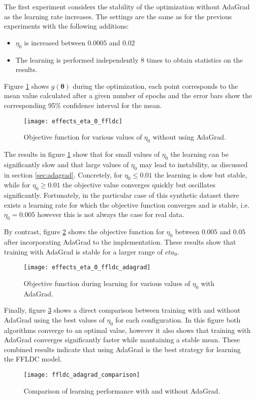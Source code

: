 The first experiment considers the stability of the optimization without AdaGrad as the learning rate increases. The settings are the same as for the previous experiments with the following additions:

\begin{itemize}
  \item $\eta_{0}$ is increased between $0.0005$ and $0.02$
  \item The learning is performed independently 8 times to obtain statistics on the results.
\end{itemize}

Figure \ref{fig:effects_eta_0} shows $g(\boldsymbol{\theta})$ during the optimization, each point corresponds to the mean value calculated after a given number of epochs and the error bars show the corresponding 95\% confidence interval for the mean.

\begin{figure}
  \centering
  \texttt{[image: effects\_eta\_0\_ffldc]}
  \caption{Objective function for various values of $\eta_0$ without using AdaGrad.}
  \label{fig:effects_eta_0}
\end{figure}

The results in figure \ref{fig:effects_eta_0} show that for small values of $\eta_0$ the learning can be significantly slow and that large values of $\eta_0$ may lead to instability, as discussed in section \ref{sec:adagrad}. Concretely, for $\eta_{0} \leq 0.01$ the learning is slow but stable, while for $\eta_{0} \geq 0.01$ the objective value converges quickly but oscillates significantly. Fortunately, in the particular case of this synthetic dataset there exists a learning rate for which the objective function converges and is stable, i.e. $\eta_{0} = 0.005$ however this is not always the case for real data.

By contrast, figure \ref{fig:effects_adagrad} shows the objective function for $\eta_{0}$ between $0.005$ and $0.05$ after incorporating AdaGrad to the implementation. These results show that training with AdaGrad is stable for a larger range of $eta_0$.

\begin{figure}
  \centering
  \texttt{[image: effects\_eta\_0\_ffldc\_adagrad]}
  \caption{Objective function during learning for various values of $\eta_0$ with AdaGrad.}
  \label{fig:effects_adagrad}
\end{figure}

Finally, figure \ref{fig:comparison_adagrad_ffldc_toy} shows a direct comparison between training with and without AdaGrad using the best values of $\eta_0$ for each configuration. In this figure both algorithms converge to an optimal value, however it also shows that training with AdaGrad converges significantly faster while mantaining a stable mean. These combined results indicate that using AdaGrad is the best strategy for learning the FFLDC model.

\begin{figure}
  \centering
  \texttt{[image: ffldc\_adagrad\_comparison]}
  \caption{Comparison of learning performance with and without AdaGrad.}
  \label{fig:comparison_adagrad_ffldc_toy}
\end{figure}
